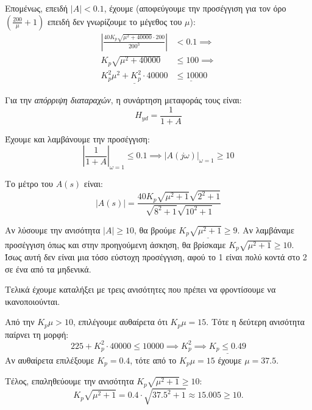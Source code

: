 \documentclass[11pt,a4paper,notitlepage,fleqn]{article}
\begin{document}
\begin{exercise}
Επομένως, επειδή \( |A| < 0.1 \), έχουμε (αποφεύγουμε την προσέγγιση για τον όρο
\( \left(\frac{200}{μ}+1\right) \) επειδή δεν γνωρίζουμε το μέγεθος του \( μ \)):
\begin{align*}
	\left|
	\frac{40K_p\sqrt{μ^2+40000}\cdot 200}{200^3}
	\right| &< 0.1 \implies \\
	K_p \sqrt{μ^2 + 40000} &\leq 100 \implies \\
	\underline{K_p^2μ^2+K_p^2\cdot 40000}& \underline{\leq 10000}
\end{align*}

Για την \textit{απόρριψη διαταραχών}, η συνάρτηση μεταφοράς τους είναι:
\[
H_{yd} = \frac{1}{1+A}
\]

Έχουμε και λαμβάνουμε την προσέγγιση:
\[
\left|\frac{1}{1+A}\right|_{\omega = 1} \leq 0.1
\implies |A(j\omega )|_{\omega =1} \geq 10
\]

Το μέτρο του \( A(s) \) είναι:
\[
\left|A(s)\right|
= \frac{40K_p \sqrt{μ^2+1}\sqrt{2^2+1}}{\sqrt{8^2+1}\sqrt{10^2+1}}
\]

Αν λύσουμε την ανισότητα \( |A|\geq 10 \), θα βρούμε \( \underline{K_p\sqrt{μ^2+1} \geq 9} \).
Αν λαμβάναμε προσέγγιση όπως και στην προηγούμενη άσκηση, θα βρίσκαμε \( K_p\sqrt{μ^2+1} \geq 10 \). Ίσως αυτή δεν είναι μια τόσο εύστοχη
προσέγγιση, αφού το 1 είναι πολύ κοντά στο 2 σε ένα από τα μηδενικά.

Τελικά έχουμε καταλήξει με τρεις ανισότητες που πρέπει να φροντίσουμε να ικανοποιούνται.

Από την \( K_p μ > 10 \), επιλέγουμε αυθαίρετα ότι \( K_pμ = 15 \). Τότε η δεύτερη
ανισότητα παίρνει τη μορφή:
\[
225 + K_p^2\cdot 40000 \leq 10000
\implies K_p^2 \implies \underline{K_p \leq 0.49}
\]
Αν αυθαίρετα επιλέξουμε \( K_p = 0.4 \), τότε από το \( K_p μ=15 \) έχουμε \( μ=37.5 \).

Τέλος, επαληθεύουμε την ανισότητα \( K_p\sqrt{μ^2+1} \geq 10 \):
\[
K_p\sqrt{μ^2+1}
= 0.4\cdot \sqrt{37.5^2 + 1} \approx 15.005 \geq 10.
\]

\end{exercise}
\end{document}
